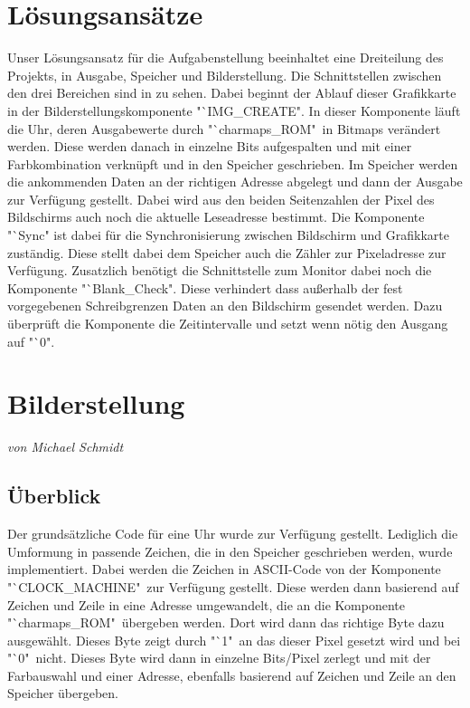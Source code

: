 \documentclass[12pt,a4paper,bibliography=totoc,listof=totoc]{scrartcl}
\begin{document}
\section {Lösungsansätze}
 
Unser Lösungsansatz für die Aufgabenstellung beeinhaltet eine Dreiteilung des Projekts, in Ausgabe, Speicher und Bilderstellung. Die Schnittstellen 
zwischen den drei Bereichen sind in %
zu sehen. 
Dabei beginnt der Ablauf dieser Grafikkarte in der Bilderstellungskomponente "`IMG\_CREATE". In dieser Komponente läuft die Uhr, deren Ausgabewerte 
durch "`charmaps\_ROM"\, in Bitmaps verändert werden. Diese werden danach in einzelne Bits aufgespalten und mit einer Farbkombination verknüpft 
und in den Speicher geschrieben. 
\newline 
Im Speicher werden die ankommenden Daten an der richtigen Adresse abgelegt und dann der Ausgabe zur Verfügung gestellt. Dabei wird aus den beiden 
Seitenzahlen der Pixel des Bildschirms auch noch die aktuelle Leseadresse bestimmt.
\newline
Die Komponente "`Sync" ist dabei für die Synchronisierung zwischen Bildschirm und Grafikkarte zuständig. Diese stellt dabei dem Speicher auch die 
Zähler zur Pixeladresse zur Verfügung.
Zusatzlich benötigt die Schnittstelle zum Monitor dabei noch die Komponente "`Blank\_Check". Diese verhindert dass außerhalb der fest vorgegebenen 
Schreibgrenzen Daten an den Bildschirm gesendet werden. Dazu überprüft die Komponente die Zeitintervalle und setzt wenn nötig den Ausgang 
auf "`0".


\pagebreak
\section{Bilderstellung}
\textit{von Michael Schmidt}
\subsection{Überblick}
Der grundsätzliche Code für eine Uhr wurde zur Verfügung gestellt. Lediglich die Umformung in passende Zeichen, die in den Speicher geschrieben 
werden, wurde implementiert. Dabei werden die Zeichen in ASCII-Code von der Komponente "`CLOCK\_MACHINE" \,zur Verfügung gestellt. Diese werden 
dann basierend auf Zeichen und Zeile in eine Adresse umgewandelt, die an die Komponente "`charmaps\_ROM"\, übergeben werden. Dort wird dann das 
richtige Byte dazu ausgewählt. Dieses Byte zeigt durch "`1" \,an das dieser Pixel gesetzt wird und bei "`0" \,nicht. Dieses Byte wird dann in 
einzelne Bits/Pixel zerlegt und mit der Farbauswahl und einer Adresse, ebenfalls basierend auf Zeichen und Zeile an den Speicher übergeben. 
\end{document}
